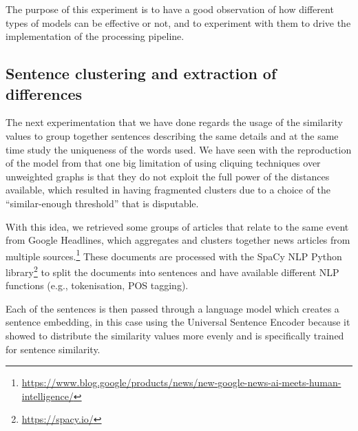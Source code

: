 The purpose of this experiment is to have a good observation of how different types of models can be effective or not, and to experiment with them to drive the implementation of the processing pipeline.


\subsection{Sentence clustering and extraction of differences}
The next experimentation that we have done regards the usage of the similarity values to group together sentences describing the same details and at the same time study the uniqueness of the words used.
We have seen with the reproduction of the model from \citet{bountouridis2018explaining} that one big limitation of using cliquing techniques over unweighted graphs is that they do not exploit the full power of the distances available, which resulted in having fragmented clusters due to a choice of the ``similar-enough threshold'' that is disputable.

With this idea, we retrieved some groups of articles that relate to the same event from Google Headlines, which aggregates and clusters together news articles from multiple sources.\footnote{\url{https://www.blog.google/products/news/new-google-news-ai-meets-human-intelligence/}}
These documents are processed with the SpaCy NLP Python library\footnote{\url{https://spacy.io/}} to split the documents into sentences and have available different NLP functions (e.g., tokenisation, POS tagging).

Each of the sentences is then passed through a language model which creates a sentence embedding, in this case using the Universal Sentence Encoder because it showed to distribute the similarity values more evenly and is specifically trained for sentence similarity.

